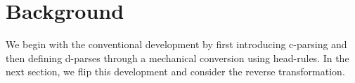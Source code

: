 \documentclass[11pt,letterpaper]{article}
\newcommand{\ParseName}{\textsc{ParPar}}
\newcommand{\nascomment}[1]{\textcolor{blue}{\bf \small [#1 --nas]}}
\begin{document}









\section{Background}
\label{sec:background}
We begin with the conventional development by first introducing c-parsing and 
then defining d-parses through a mechanical conversion using head-rules. 
In the next section, we flip this development and consider the reverse transformation. 
\end{document}
